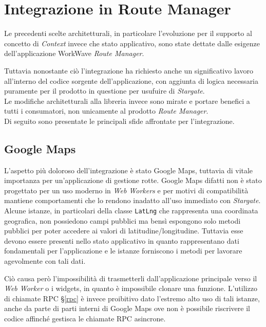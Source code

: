 
\chapter{Integrazione in Route Manager}
\label{cap:integrazione}

Le precedenti scelte architetturali, in particolare l'evoluzione per il supporto al concetto di \textit{Context} invece che stato applicativo, sono state dettate dalle esigenze dell'applicazione WorkWave \textit{Route Manager}. 

Tuttavia nonostante ciò l'integrazione ha richiesto anche un significativo lavoro all'interno del codice sorgente dell'applicazione, con aggiunta di logica necessaria puramente per il prodotto in questione per usufuire di \textit{Stargate}. \\

Le modifiche architetturali alla libreria invece sono mirate e portare benefici a tutti i consumatori, non unicamente al prodotto \textit{Route Manager}. \\

Di seguito sono presentate le principali sfide affrontate per l'integrazione.

\section{Google Maps}

L'aspetto più doloroso dell'integrazione è stato Google Maps, tuttavia di vitale importanza per un'applicazione di gestione rotte. Google Maps difatti non è stato progettato per un uso moderno in \textit{Web Workers} e per motivi di compatibilità mantiene comportamenti che lo rendono inadatto all'uso immediato con \textit{Stargate}. \\

Alcune istanze, in particolari della classe \texttt{LatLng} che rappresenta una coordinata geografica, non possiedono campi pubblici ma bensì espongono solo metodi pubblici per poter accedere ai valori di latitudine/longitudine. Tuttavia esse devono essere presenti nello stato applicativo in quanto rappresentano dati fondamentali per l'applicazione e le istanze forniscono i metodi per lavorare agevolmente con tali dati.

Ciò causa però l'impossibilità di trasmetterli dall'applicazione principale verso il \textit{Web Worker} o i widgets, in quanto è impossibile clonare una funzione. L'utilizzo di chiamate RPC §\ref{rpc} è invece proibitivo dato l'estremo alto uso di tali istanze, anche da parte di parti interni di Google Maps ove non è possibile riscrivere il codice affinché gestisca le chiamate RPC asincrone. \\

